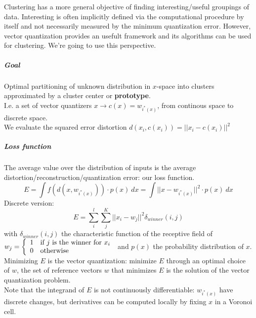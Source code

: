 \documentclass[10pt]{report}
\begin{document}
Clustering has a more general objective of finding interesting/useful groupings of data. Interesting is often implicitly defined via the computational procedure by itself and not necessarily measured by the minimum quantization error. However, vector quantization provides an usefult framework and its algorithms can be used for clustering. We're going to use this perspective.
\subparagraph{Goal} Optimal partitioning of unknown distribution in $x$-space into clusters approximated by a cluster center or \textbf{prototype}.\\
I.e. a set of vector quantizers $x\rightarrow c(x) = w_{i^*(x)}$, from continous space to discrete space.\\
We evaluate the squared error distortion $d(x_i,c(x_i)) = ||x_i-c(x_i)||^2$
\subparagraph{Loss function} The average value over the distribution of inputs is the average distortion/reconstruction/quantization error: our loss function. $$E = \int f(d(x,w_{i^*(x)}))\cdot p(x)\:dx= \int||x-w_{i^*(x)}||^2\cdot p(x)\:dx$$
Discrete version: $$E = \sum_i^l\sum_j^K||x_i-w_j||^2\delta_{winner}(i,j)$$ with $\delta_{winner}(i,j)$ the characteristic function of the receptive field of $w_j = \left\{\begin{array}{l l}
1&\hbox{if }j\hbox{ is the winner for }x_i\\
0&\hbox{otherwise}
\end{array}\right.$ and $p(x)$ the probability distribution of $x$.\\
Minimizing $E$ is the vector quantization: minimize $E$ through an optimal choice of $w$, the set of reference vectors $w$ that minimizes $E$ is the solution of the vector quantization problem.\\
Note that the integrand of $E$ is not continuously differentiable: $w_{i^*(x)}$ have discrete changes, but derivatives can be computed locally by fixing $x$ in a Voronoi cell.
\end{document}
